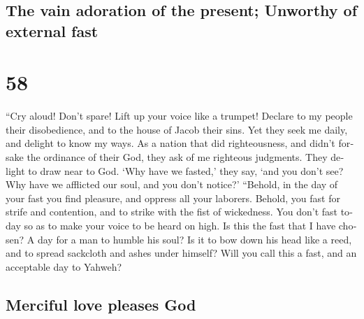 \begin{paracol}{2}
\switchcolumn
\begin{otherlanguage}{english}

\hypertarget{the-vain-adoration-of-the-present-unworthy-of-external-fast}{%
\subsection{The vain adoration of the present; Unworthy of external
fast}\label{the-vain-adoration-of-the-present-unworthy-of-external-fast}}

\hypertarget{section-115}{%
\section{58}\label{section-115}}

 ``Cry aloud! Don't spare! Lift up your voice like a
trumpet! Declare to my people their disobedience, and to the house of
Jacob their sins.  Yet they seek me daily, and delight to
know my ways. As a nation that did righteousness, and didn't forsake the
ordinance of their God, they ask of me righteous judgments. They delight
to draw near to God.  `Why have we fasted,' they say, `and
you don't see? Why have we afflicted our soul, and you don't notice?'
``Behold, in the day of your fast you find pleasure, and oppress all
your laborers.  Behold, you fast for strife and
contention, and to strike with the fist of wickedness. You don't fast
today so as to make your voice to be heard on high.  Is
this the fast that I have chosen? A day for a man to humble his soul? Is
it to bow down his head like a reed, and to spread sackcloth and ashes
under himself? Will you call this a fast, and an acceptable day to
Yahweh?

\hypertarget{merciful-love-pleases-god}{%
\subsection{Merciful love pleases God}\label{merciful-love-pleases-god}}


\end{otherlanguage}
\end{paracol}

